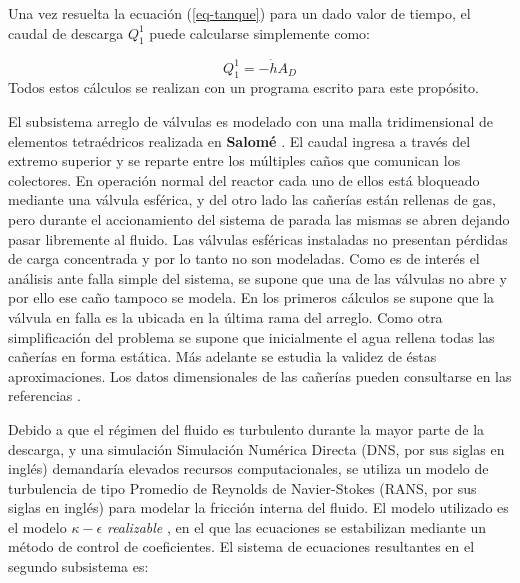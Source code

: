 Una vez resuelta la ecuación (\ref{eq-tanque}) para un dado valor de tiempo,
el caudal de descarga $Q_1^1$ puede calcularse simplemente como:

\begin{equation}
Q_1^1 = -\dot{h} A_D
\label{eq-qd}
\end{equation}
Todos estos cálculos se realizan con un programa escrito para este propósito.

El subsistema arreglo de válvulas es modelado con una malla tridimensional de elementos tetraédricos realizada en \textbf{Salomé} \cite{salome}.
El caudal ingresa a través del extremo superior y se reparte entre los múltiples caños que comunican los colectores.
En operación normal del reactor cada uno de ellos está bloqueado mediante una válvula esférica,
y del otro lado las cañerías están rellenas de gas,
pero durante el accionamiento del sistema de parada las mismas se abren dejando pasar libremente al fluido.
Las válvulas esféricas instaladas no presentan pérdidas de carga concentrada y por lo tanto no son modeladas.
Como es de interés el análisis ante falla simple del sistema,
se supone que una de las válvulas no abre y por ello ese caño tampoco se modela.
En los primeros cálculos se supone que la válvula en falla es la ubicada en la última rama del arreglo.
Como otra simplificación del problema se supone que inicialmente el agua rellena todas las cañerías en forma estática.
Más adelante se estudia la validez de éstas aproximaciones.
Los datos dimensionales de las cañerías pueden consultarse en las referencias \cite{invap-mockup}.

Debido a que el régimen del fluido es turbulento durante la mayor parte de la descarga,
y una simulación Simulación Numérica Directa (DNS, por sus siglas en inglés) demandaría elevados recursos computacionales,
se utiliza un modelo de turbulencia de tipo Promedio de Reynolds de Navier-Stokes (RANS, por sus siglas en inglés)
para modelar la fricción interna del fluido.
El modelo utilizado es el modelo $\kappa-\epsilon$ \textit{realizable} \cite{k-e-realizable},
en el que las ecuaciones se estabilizan mediante un método de control de coeficientes.
El sistema de ecuaciones resultantes en el segundo subsistema es:

